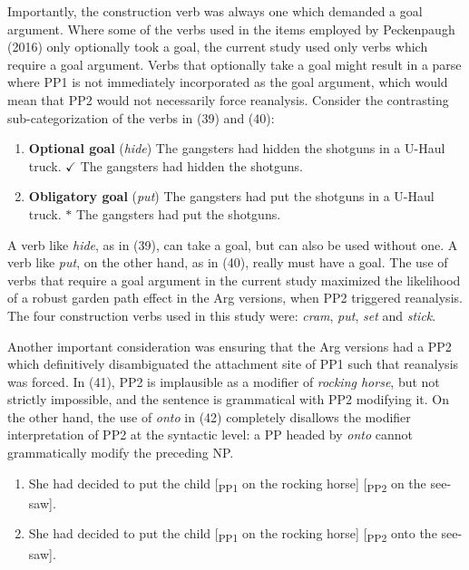 \documentclass[12pt,oneside]{book}
\providecommand{\tightlist}{%
  \setlength{\itemsep}{0pt}\setlength{\parskip}{0pt}}
\begin{document}
Importantly, the construction verb was always one which demanded a goal argument. Where some of the verbs used in the items employed by Peckenpaugh (2016) only optionally took a goal, the current study used only verbs which require a goal argument. Verbs that optionally take a goal might result in a parse where PP1 is not immediately incorporated as the goal argument, which would mean that PP2 would not necessarily force reanalysis. Consider the contrasting sub-categorization of the verbs in (39) and (40):

\begin{enumerate}
\def\labelenumi{(\arabic{enumi})}
\setcounter{enumi}{38}
\item
  \textbf{Optional goal} (\emph{hide}) \linebreak
  The gangsters had hidden the shotguns in a U-Haul truck. \linebreak
  \(\checkmark\) The gangsters had hidden the shotguns. \linebreak
\item
  \textbf{Obligatory goal} (\emph{put}) \linebreak
  The gangsters had put the shotguns in a U-Haul truck. \linebreak
  \(*\) The gangsters had put the shotguns. \linebreak
\end{enumerate}

A verb like \emph{hide}, as in (39), can take a goal, but can also be used without one. A verb like \emph{put}, on the other hand, as in (40), really must have a goal. The use of verbs that require a goal argument in the current study maximized the likelihood of a robust garden path effect in the Arg versions, when PP2 triggered reanalysis. The four construction verbs used in this study were: \emph{cram}, \emph{put}, \emph{set} and \emph{stick}.

Another important consideration was ensuring that the Arg versions had a PP2 which definitively disambiguated the attachment site of PP1 such that reanalysis was forced. In (41), PP2 is implausible as a modifier of \emph{rocking horse}, but not strictly impossible, and the sentence is grammatical with PP2 modifying it. On the other hand, the use of \emph{onto} in (42) completely disallows the modifier interpretation of PP2 at the syntactic level: a PP headed by \emph{onto} cannot grammatically modify the preceding NP.

\begin{enumerate}
\def\labelenumi{(\arabic{enumi})}
\setcounter{enumi}{40}
\tightlist
\item
  She had decided to put the child {[}\textsubscript{PP1} on the rocking horse{]} {[}\textsubscript{PP2} on the see-saw{]}.
\item
  She had decided to put the child {[}\textsubscript{PP1} on the rocking horse{]} {[}\textsubscript{PP2} onto the see-saw{]}.
\end{enumerate}
\end{document}
